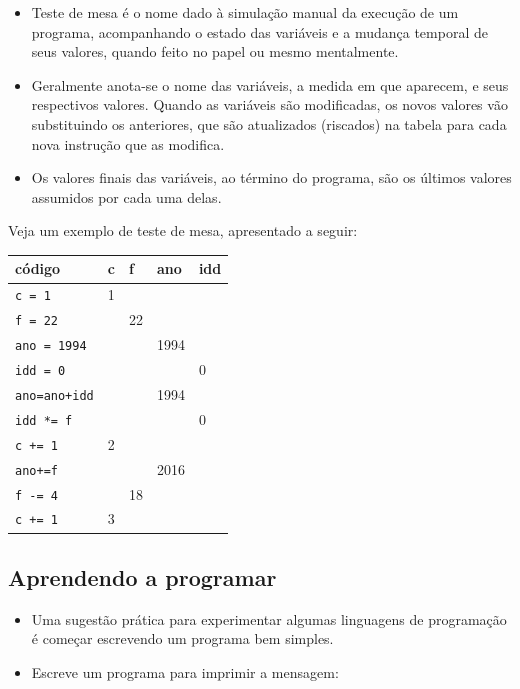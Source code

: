 \documentclass[12pt,a4paper]{article}
\begin{document}
    \begin{itemize}
\item
  Teste de mesa é o nome dado à simulação manual da execução de um
  programa, acompanhando o estado das variáveis e a mudança temporal de
  seus valores, quando feito no papel ou mesmo mentalmente.
\item
  Geralmente anota-se o nome das variáveis, a medida em que aparecem, e
  seus respectivos valores. Quando as variáveis são modificadas, os
  novos valores vão substituindo os anteriores, que são atualizados
  (riscados) na tabela para cada nova instrução que as modifica.
\item
  Os valores finais das variáveis, ao término do programa, são os
  últimos valores assumidos por cada uma delas.
\end{itemize}

Veja um exemplo de teste de mesa, apresentado a seguir:

\begin{longtable}[]{@{}lllll@{}}
\toprule()
código & c & f & ano & idd \\
\midrule()
\endhead
\texttt{c\ =\ 1} & 1 & & & \\
\texttt{f\ =\ 22} & & 22 & & \\
\texttt{ano\ =\ 1994} & & & 1994 & \\
\texttt{idd\ =\ 0} & & & & 0 \\
\texttt{ano=ano+idd} & & & 1994 & \\
\texttt{idd\ *=\ f} & & & & 0 \\
\texttt{c\ +=\ 1} & 2 & & & \\
\texttt{ano+=f} & & & 2016 & \\
\texttt{f\ -=\ 4} & & 18 & & \\
\texttt{c\ +=\ 1} & 3 & & & \\
\bottomrule()
\end{longtable}

    \hypertarget{aprendendo-a-programar}{%
\subsection{Aprendendo a programar}\label{aprendendo-a-programar}}

    \begin{itemize}
\item
  Uma sugestão prática para experimentar algumas linguagens de
  programação é começar escrevendo um programa bem simples.
\item
  Escreve um programa para imprimir a mensagem:
\end{itemize}
\end{document}

